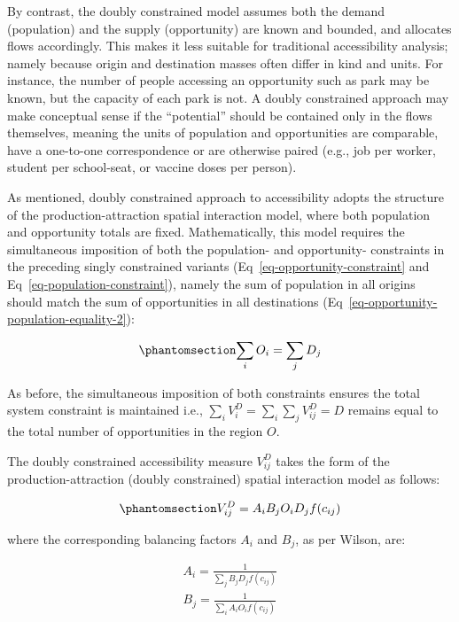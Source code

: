 \documentclass[
  10pt,
  letterpaper,
]{article}
\begin{document}
By contrast, the doubly constrained model assumes both the demand
(population) and the supply (opportunity) are known and bounded, and
allocates flows accordingly. This makes it less suitable for traditional
accessibility analysis; namely because origin and destination masses
often differ in kind and units. For instance, the number of people
accessing an opportunity such as park may be known, but the capacity of
each park is not. A doubly constrained approach may make conceptual
sense if the ``potential'' should be contained only in the flows
themselves, meaning the units of population and opportunities are
comparable, have a one-to-one correspondence or are otherwise paired
(e.g., job per worker, student per school-seat, or vaccine doses per
person).

As mentioned, doubly constrained approach to accessibility adopts the
structure of the production-attraction spatial interaction model, where
both population and opportunity totals are fixed. Mathematically, this
model requires the simultaneous imposition of both the population- and
opportunity- constraints in the preceding singly constrained variants
(Eq~\ref{eq-opportunity-constraint} and
Eq~\ref{eq-population-constraint}), namely the sum of population in all
origins should match the sum of opportunities in all destinations
(Eq~\ref{eq-opportunity-population-equality-2}):

\begin{equation}\phantomsection\label{eq-opportunity-population-equality-2}{
\sum_i O_i = \sum_j D_j
}\end{equation}

As before, the simultaneous imposition of both constraints ensures the
total system constraint is maintained i.e.,
\(\sum_i V^D_{i} = \sum_i\sum_j  V^D_{ij} = D\) remains equal to the
total number of opportunities in the region \(O\).

The doubly constrained accessibility measure \(V_{ij}^D\) takes the form
of the production-attraction (doubly constrained) spatial interaction
model as follows:

\begin{equation}\phantomsection\label{eq-doubly-constrained-accessibility}{
V_{ij}^D = A_i B_j O_i D_j f(c_{ij})
}\end{equation}

\noindent where the corresponding balancing factors \(A_i\) and \(B_j\),
as per Wilson, are:

\[
\begin{array}{l}
A_i = \frac{1}{\sum_j B_j D_j f(c_{ij})}\\
B_j = \frac{1}{\sum_i A_i O_i f(c_{ij})}
\end{array}
\]
\end{document}
